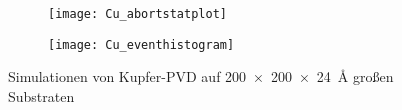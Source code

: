 \begin{figure}

  \captionsetup[subfigure]{justification=centering,singlelinecheck=false}
  \def\subfigwidth{7cm}

  \begin{subfigure}[t]{\subfigwidth}
    \texttt{[image: Cu\_abortstatplot]}
    \label{fig:copperparsivald-c}
  \end{subfigure}
  \hfill
  \begin{subfigure}[t]{\subfigwidth}
    \texttt{[image: Cu\_eventhistogram]}
    \label{fig:copperparsivald-d}
  \end{subfigure}
  \caption{Simulationen von Kupfer-PVD auf \SI{200x200x24}{\angstrom} großen Substraten}
  \label{fig:copperparsivald}
\end{figure}

